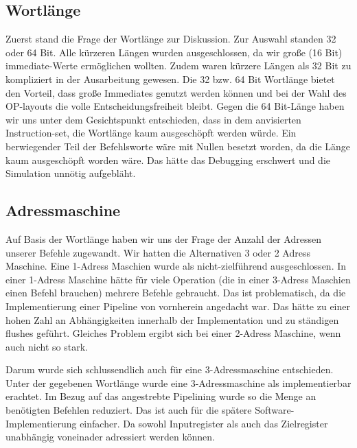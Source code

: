 \documentclass[paper=a4,fontsize=12pt,twocolumn]{scrreprt}
\begin{document}
\kant[6]

\subsection{Wortlänge} 

Zuerst stand die Frage der Wortlänge zur Diskussion. 
Zur Auswahl standen 32 oder 64 Bit. Alle kürzeren Längen wurden ausgeschlossen, da wir große (16 Bit) immediate-Werte ermöglichen wollten. Zudem waren  kürzere Längen als 32 Bit zu kompliziert in der Ausarbeitung gewesen.
Die 32 bzw. 64 Bit Wortlänge bietet den Vorteil, dass große Immediates genutzt werden können und bei der Wahl des OP-layouts die volle Entscheidungsfreiheit bleibt. 
Gegen die 64 Bit-Länge haben wir uns unter dem Gesichtspunkt entschieden, dass in dem anvisierten Instruction-set, die Wortlänge kaum ausgeschöpft werden würde. Ein berwiegender Teil der Befehlsworte wäre mit Nullen besetzt worden, da die Länge kaum ausgeschöpft worden wäre. Das hätte das Debugging erschwert und die Simulation unnötig aufgebläht. 

\subsection{Adressmaschine}
Auf Basis der Wortlänge haben wir uns der Frage der Anzahl der Adressen unserer Befehle zugewandt. Wir hatten die Alternativen 3 oder 2 Adress Maschine. Eine 1-Adress Maschien wurde als nicht-zielführend ausgeschlossen. In einer 1-Adress Maschine hätte für viele Operation (die in einer 3-Adress Maschien einen Befehl brauchen) mehrere Befehle gebraucht. Das ist problematisch, da die Implementierung einer Pipeline von vornherein angedacht war. Das hätte zu einer hohen Zahl an Abhängigkeiten innerhalb der Implementation und zu ständigen flushes geführt. Gleiches Problem ergibt sich bei einer 2-Adress Maschine, wenn auch nicht so stark. 

Darum wurde sich schlussendlich auch für eine 3-Adressmaschine entschieden. Unter der gegebenen Wortlänge wurde eine 3-Adressmaschine als implementierbar erachtet. Im Bezug auf das angestrebte Pipelining wurde so die Menge an benötigten Befehlen reduziert. Das ist auch für die spätere Software-Implementierung einfacher. Da sowohl Inputregister als auch das Zielregister unabhängig voneinader adressiert werden können.
\end{document}
